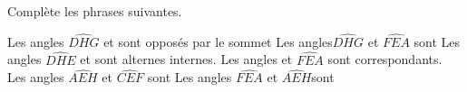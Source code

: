 %
%
Complète les phrases suivantes.
    \begin{center}
    \end{center}
    \begin{tasks}
        \task Les angles $\widehat{DHG}$ et \dotfill sont opposés par le sommet
        \task Les angles$\widehat{DHG}$ et $\widehat{FEA}$ sont \dotfill
        \task Les angles $\widehat{DHE}$ et \dotfill sont alternes internes.
        \task Les angles \dotfill et $\widehat{FEA}$ sont correspondants.
        \task Les angles $\widehat{AEH}$ et $\widehat{CEF}$ sont \dotfill
        \task Les angles $\widehat{FEA}$ et $\widehat{AEH}$sont\dotfill
    \end{tasks}
